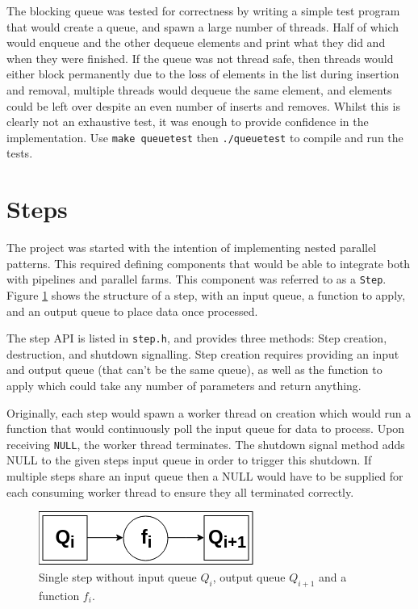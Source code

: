 \documentclass[12pt]{article}
\def\code#1{\texttt{#1}}
\begin{document}
The blocking queue was tested for correctness by writing a simple test program that would create a queue, and spawn a large number of threads. Half of which would enqueue and the other dequeue elements and print what they did and when they were finished. If the queue was not thread safe, then threads would either block permanently due to the loss of elements in the list during insertion and removal, multiple threads would dequeue the same element, and elements could be left over despite an even number of inserts and removes. Whilst this is clearly not an exhaustive test, it was enough to provide confidence in the implementation. Use \code{make queuetest} then \code{./queuetest} to compile and run the tests.

\section{Steps}

The project was started with the intention of implementing nested parallel patterns. This required defining components that would be able to integrate both with pipelines and parallel farms. This component was referred to as a \code{Step}. Figure \ref{fig:step} shows the structure of a step, with an input queue, a function to apply, and an output queue to place data once processed.

The step API is listed in \code{step.h}, and provides three methods: Step creation, destruction, and shutdown signalling. Step creation requires providing an input and output queue (that can't be the same queue), as well as the function to apply which could take any number of parameters and return anything. 

Originally, each step would spawn a worker thread on creation which would run a function that would continuously poll the input queue for data to process. Upon receiving \code{NULL}, the worker thread terminates. The shutdown signal method adds NULL to the given steps input queue in order to trigger this shutdown. If multiple steps share an input queue then a NULL would have to be supplied for each consuming worker thread to ensure they all terminated correctly.

\begin{figure}[!ht]
	\centering 
	\includegraphics[width=0.45\linewidth]{images/step}
	\caption{Single step without input queue $Q_i$, output queue $Q_{i+1}$ and a function $f_i$.}
	\label{fig:step}
\end{figure}
\end{document}
